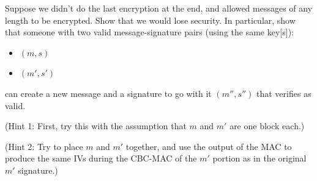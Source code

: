 \documentclass[12pt]{article}
\begin{document}
Suppose we didn't do the last encryption at the end, and allowed messages of any length to be encrypted. Show that we would lose security. In particular, show that someone with two valid message-signature pairs (using the same key[s]):

\begin{itemize}
\item $(m, s)$
\item $(m', s')$
\end{itemize}

can create a new message and a signature to go with it $(m'', s'')$ that verifies as valid.

(Hint 1: First, try this with the assumption that $m$ and $m'$ are one block each.)

(Hint 2: Try to place $m$ and $m'$ together, and use the output of the MAC to produce the same IVs during the CBC-MAC of the $m'$ portion as in the original $m'$ signature.)

\end{document}
